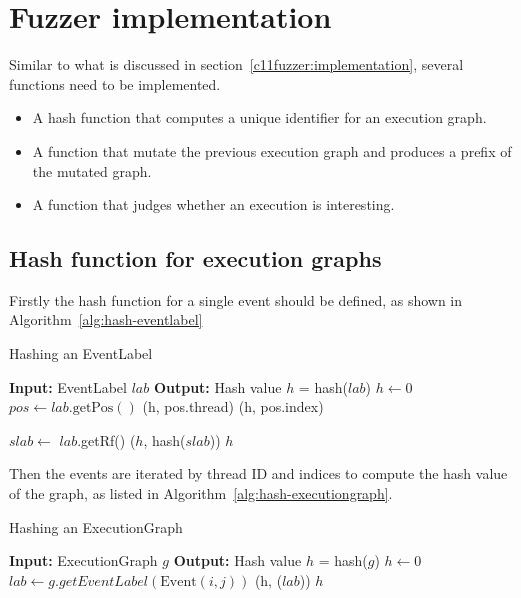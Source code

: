 \section{Fuzzer implementation}

Similar to what is discussed in section~\ref{c11fuzzer:implementation}, several functions need to be implemented.

\begin{itemize}
	\item A hash function that computes a unique identifier for an execution graph.
	\item A function that mutate the previous execution graph and produces a prefix of the mutated graph.
	\item A function that judges whether an execution is interesting.
\end{itemize}


\subsection{Hash function for execution graphs}\label{sec:hashf}
Firstly the hash function for a single event should be defined, as shown in Algorithm~\ref{alg:hash-eventlabel}

\begin{algorithm}
	\caption{Hashing an EventLabel}
	\label{alg:hash-eventlabel}
	\begin{algorithmic}[1]
		\STATE \textbf{Input:} EventLabel $lab$
		\STATE \textbf{Output:} Hash value $h$ = hash($lab$)
		\STATE $h \leftarrow 0$
		\STATE $pos \leftarrow lab.\text{getPos}()$
		\STATE {}(h, pos.thread)
		\STATE {}(h, pos.index)

		\STATE $slab \leftarrow$ $lab$.getRf()
		\STATE {}($h$, hash($slab$))
		\ENDIF
		\ENDIF
		\RETURN $h$
	\end{algorithmic}
\end{algorithm}

Then the events are iterated by thread ID and indices to compute the hash value of the graph, as listed in Algorithm~\ref{alg:hash-executiongraph}.

\begin{algorithm}
	\caption{Hashing an ExecutionGraph}
	\label{alg:hash-executiongraph}
	\begin{algorithmic}[1]
		\STATE \textbf{Input:} ExecutionGraph $g$
		\STATE \textbf{Output:} Hash value $h$ = hash($g$)
		\STATE $h \leftarrow 0$
		\STATE $lab \leftarrow g.getEventLabel(\text{Event}(i, j))$
		\STATE {}(h, ($lab$))
		\ENDFOR
		\ENDFOR
		\RETURN $h$
	\end{algorithmic}
\end{algorithm}

